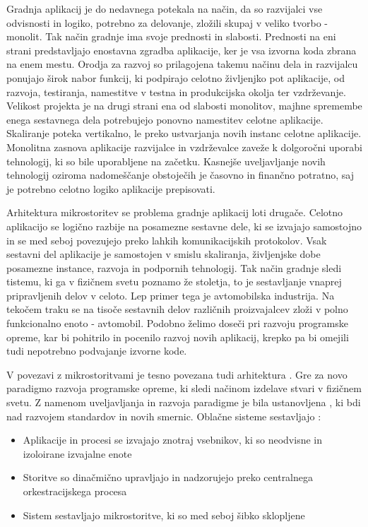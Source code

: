 \documentclass[a4paper, 12pt]{book}
\begin{document}
Gradnja aplikacij je do nedavnega potekala na način, da so razvijalci vse odvisnosti in logiko, potrebno za delovanje, zložili skupaj v veliko tvorbo - monolit.
Tak način gradnje ima svoje prednosti in slabosti.
Prednosti na eni strani predstavljajo enostavna zgradba aplikacije, ker je vsa izvorna koda zbrana na enem mestu.
Orodja za razvoj so prilagojena takemu načinu dela in razvijalcu ponujajo širok nabor funkcij, ki podpirajo celotno življenjko pot aplikacije, od razvoja, testiranja, namestitve v testna in produkcijska okolja ter vzdrževanje.
Velikost projekta je na drugi strani ena od slabosti monolitov, majhne spremembe enega sestavnega dela potrebujejo ponovno namestitev celotne aplikacije.
Skaliranje poteka vertikalno, le preko ustvarjanja novih instanc celotne aplikacije.
Monolitna zasnova aplikacije razvijalce in vzdrževalce zaveže k dolgoročni uporabi tehnologij, ki so bile uporabljene na začetku.
Kasnejše uveljavljanje novih tehnologij oziroma nadomeščanje obstoječih je časovno in finančno potratno, saj je potrebno celotno logiko aplikacije prepisovati. \cite{monolithMicroservice}

Arhitektura mikrostoritev se problema gradnje aplikacij loti drugače.
Celotno aplikacijo se logično razbije na posamezne sestavne dele, ki se izvajajo samostojno in se med seboj povezujejo preko lahkih komunikacijskih protokolov.
Vsak sestavni del aplikacije je samostojen v smislu skaliranja, življenjske dobe posamezne instance, razvoja in podpornih tehnologij.
Tak način gradnje sledi tistemu, ki ga v fizičnem svetu poznamo že stoletja, to je sestavljanje vnaprej pripravljenih delov v celoto.
Lep primer tega je avtomobilska industrija.
Na tekočem traku se na tisoče sestavnih delov različnih proizvajalcev zloži v polno funkcionalno enoto - avtomobil.
Podobno želimo doseči pri razvoju programske opreme, kar bi pohitrilo in pocenilo razvoj novih aplikacij, krepko pa bi omejili tudi nepotrebno podvajanje izvorne kode. \cite{microservicePattern, microservicesMartin}

V povezavi z mikrostoritvami je tesno povezana tudi arhitektura .
Gre za novo paradigmo razvoja programske opreme, ki sledi načinom izdelave stvari v fizičnem svetu.
Z namenom uveljavljanja in razvoja paradigme je bila ustanovljena , ki bdi nad razvojem standardov in novih smernic.
Oblačne sisteme sestavljajo \cite{cncf}:
\begin{itemize}
	\item Aplikacije in procesi se izvajajo znotraj vsebnikov, ki so neodvisne in izoloirane izvajalne enote
	\item Storitve so dinačmično upravljajo in nadzorujejo preko centralnega orkestracijskega procesa
	\item Sistem sestavljajo mikrostoritve, ki so med seboj šibko sklopljene
\end{itemize}
\end{document}
